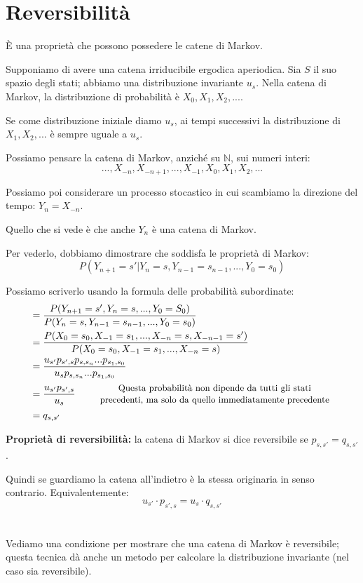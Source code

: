 \documentclass[a4paper,12pt]{book}
\begin{document}
\section{Reversibilità}
È una proprietà che possono possedere le catene di Markov. 

Supponiamo di avere una catena irriducibile ergodica aperiodica. Sia $ S $ il suo spazio degli stati; abbiamo una distribuzione invariante $ u_s $. Nella catena di Markov, la distribuzione di probabilità è $ X_0, X_1, X_2, ... $.

Se come distribuzione iniziale diamo $ u_s $, ai tempi successivi la distribuzione di $ X_1, X_2, ... $ è sempre uguale a $ u_s $.

Possiamo pensare la catena di Markov, anziché su $ \mathbb{N} $, sui numeri interi:
$$  ..., X_{-n}, X_{-n+1}, ..., X_{-1}, X_0, X_1, X_2, ... $$

Possiamo poi considerare un processo stocastico in cui scambiamo la direzione del tempo: $ Y_n = X_{-n} $.

Quello che si vede è che anche $ Y_n $ è una catena di Markov. 

Per vederlo, dobbiamo dimostrare che soddisfa le proprietà di Markov:
$$ P (Y_{n+1} = s' | Y_{n} = s, Y_{n-1} = s_{n-1}, ..., Y_0 = s_0) $$ 

Possiamo scriverlo usando la formula delle probabilità subordinate:
\begin{align*}
	& = \frac{P(Y_{n+1} = s', Y_n = s, ..., Y_0 = S_0)}{P(Y_n = s, Y_{n-1} = s_{n-1}, ..., Y_0 = s_0)} \\ 
	& = \frac{P(X_0=s_0, X_{-1} = s_1, ..., X_{-n} = s, X_{-n-1} = s')}{P(X_0 = s_0, X_{-1} = s_1, ..., X_{-n} = s)} \\
	& = \frac{u_{s'}p_{s',s} p_{s,s_n}...p_{s_1, s_0}}{u_s p_{s,s_n}...p_{s_1, s_0}} \\
	& = \frac{u_{s'} p_{s',s}}{u_s} \qquad \begin{array}{c}
		\text{\small Questa probabilità non dipende da tutti gli stati} \\ 
		\text{\small precedenti, ma solo da quello immediatamente precedente} 
	\end{array} \\
	& = q_{s,s'}
\end{align*}

\textbf{Proprietà di reversibilità:} 
 la catena di Markov si dice reversibile se $ p_{s,s'} = q_{s,s'} $. 

Quindi se guardiamo la catena all'indietro è la stessa originaria in senso contrario. Equivalentemente:
$$ u_{s'} \cdot p_{s',s} = u_s \cdot q_{s,s'} $$
\\
\\
Vediamo una condizione per mostrare che una catena di Markov è reversibile; questa tecnica dà anche un metodo per calcolare la distribuzione invariante (nel caso sia reversibile). 
\end{document}
